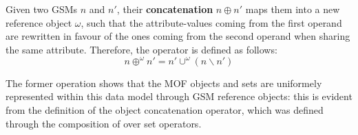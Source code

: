 \begin{definition}
	Given two GSMs  $n$ and $n'$, their \textbf{concatenation} $n\oplus n'$ maps them into a new reference object $\omega$, such that the attribute-values coming from the first operand are rewritten in favour of the ones coming from the second operand when sharing the same attribute. Therefore, the operator is defined as follows:
	\[n\oplus^\omega n'=n'\cup^\omega (n\backslash n')\]
\end{definition}

The former operation shows that the MOF objects and sets are uniformely represented within this data model through GSM reference objects: this is evident from the definition of the object concatenation operator, which was defined through the composition of over set operators.
